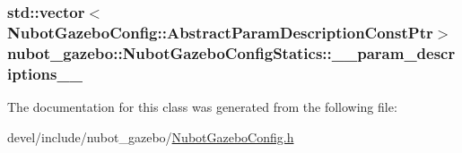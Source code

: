 \hypertarget{classnubot__gazebo_1_1NubotGazeboConfigStatics_af7c85af028b2c9a511e6435d6fde46a7}{
\subsubsection[{\-\_\-\-\_\-param\-\_\-descriptions\-\_\-\-\_\-}]{\setlength{\rightskip}{0pt plus 5cm}std\-::vector$<${\bf Nubot\-Gazebo\-Config\-::\-Abstract\-Param\-Description\-Const\-Ptr}$>$ nubot\-\_\-gazebo\-::\-Nubot\-Gazebo\-Config\-Statics\-::\-\_\-\-\_\-param\-\_\-descriptions\-\_\-\-\_\-\hspace{0.3cm}{\ttfamily [private]}}}\label{classnubot__gazebo_1_1NubotGazeboConfigStatics_af7c85af028b2c9a511e6435d6fde46a7}


The documentation for this class was generated from the following file\-:\begin{DoxyCompactItemize}
\item 
devel/include/nubot\-\_\-gazebo/\hyperlink{NubotGazeboConfig_8h}{Nubot\-Gazebo\-Config.\-h}\end{DoxyCompactItemize}
